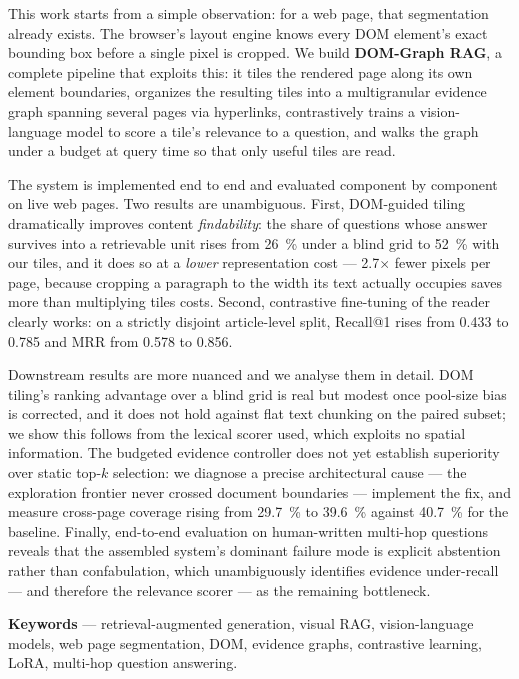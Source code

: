 This work starts from a simple observation: for a web page, that segmentation
already exists. The browser's layout engine knows every DOM element's exact
bounding box before a single pixel is cropped. We build \textbf{DOM-Graph RAG},
a complete pipeline that exploits this: it tiles the rendered page along its own
element boundaries, organizes the resulting tiles into a multigranular evidence
graph spanning several pages via hyperlinks, contrastively trains a
vision-language model to score a tile's relevance to a question, and walks the
graph under a budget at query time so that only useful tiles are read.

The system is implemented end to end and evaluated component by component on
live web pages. Two results are unambiguous. First, DOM-guided tiling
dramatically improves content \emph{findability}: the share of questions whose
answer survives into a retrievable unit rises from \SI{26}{\percent} under a
blind grid to \SI{52}{\percent} with our tiles, and it does so at a
\emph{lower} representation cost --- \num{2.7}$\times$ fewer pixels per page,
because cropping a paragraph to the width its text actually occupies saves more
than multiplying tiles costs. Second, contrastive fine-tuning of the reader
clearly works: on a strictly disjoint article-level split, Recall@1 rises from
\num{0.433} to \num{0.785} and MRR from \num{0.578} to \num{0.856}.

Downstream results are more nuanced and we analyse them in detail. DOM tiling's
ranking advantage over a blind grid is real but modest once pool-size bias is
corrected, and it does not hold against flat text chunking on the paired subset;
we show this follows from the lexical scorer used, which exploits no spatial
information. The budgeted evidence controller does not yet establish
superiority over static top-$k$ selection: we diagnose a precise architectural
cause --- the exploration frontier never crossed document boundaries ---
implement the fix, and measure cross-page coverage rising from \SI{29.7}{\percent}
to \SI{39.6}{\percent} against \SI{40.7}{\percent} for the baseline. Finally,
end-to-end evaluation on human-written multi-hop questions reveals that the
assembled system's dominant failure mode is explicit abstention rather than
confabulation, which unambiguously identifies evidence under-recall --- and
therefore the relevance scorer --- as the remaining bottleneck.

\vspace{0.6em}
\noindent\textbf{Keywords} --- retrieval-augmented generation, visual RAG,
vision-language models, web page segmentation, DOM, evidence graphs,
contrastive learning, LoRA, multi-hop question answering.
